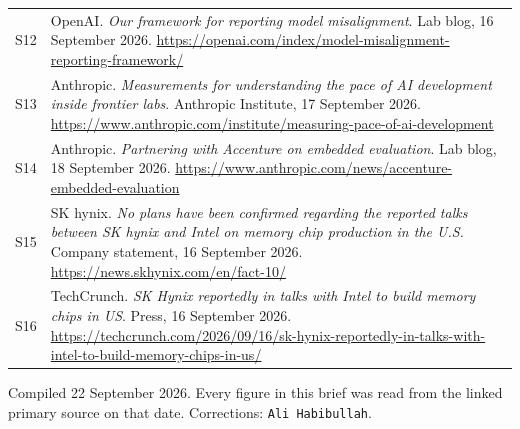\documentclass[11pt,a4paper]{article}
\newcommand{\briefdate}{22 September 2026}
\newcommand{\briefauthor}{Ali Habibullah}
\begin{document}
{\begin{tabularx}{\textwidth}{@{}l X@{}}
S12 & OpenAI. \emph{Our framework for reporting model misalignment}. Lab blog, 16 September 2026. \url{https://openai.com/index/model-misalignment-reporting-framework/} \\
S13 & Anthropic. \emph{Measurements for understanding the pace of AI development inside frontier labs}. Anthropic Institute, 17 September 2026. \url{https://www.anthropic.com/institute/measuring-pace-of-ai-development} \\
S14 & Anthropic. \emph{Partnering with Accenture on embedded evaluation}. Lab blog, 18 September 2026. \url{https://www.anthropic.com/news/accenture-embedded-evaluation} \\
S15 & SK hynix. \emph{No plans have been confirmed regarding the reported talks between SK hynix and Intel on memory chip production in the U.S.} Company statement, 16 September 2026. \url{https://news.skhynix.com/en/fact-10/} \\
S16 & TechCrunch. \emph{SK Hynix reportedly in talks with Intel to build memory chips in US}. Press, 16 September 2026. \url{https://techcrunch.com/2026/09/16/sk-hynix-reportedly-in-talks-with-intel-to-build-memory-chips-in-us/} \\
\bottomrule
\end{tabularx}}

\vspace{0.8em}
{\footnotesize\color{brandgrey}
Compiled \briefdate. Every figure in this brief was read from the linked primary
source on that date. Corrections: \texttt{\briefauthor}.}
\end{document}
